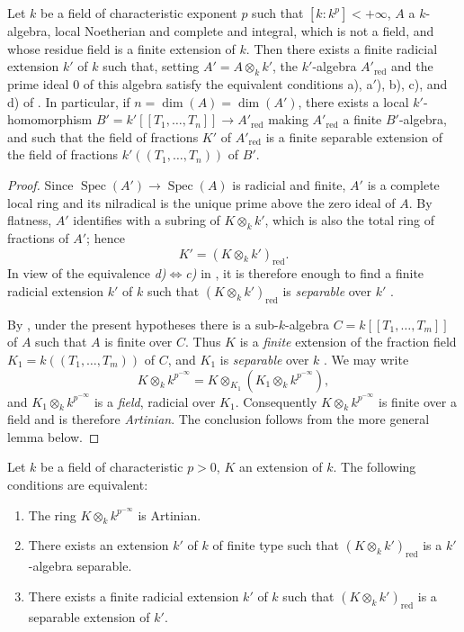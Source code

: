 \begin{corollary}[18.11.12]
\label{IV.18.11.12}
Let $k$ be a field of characteristic exponent $p$ such that $[k:k^p]<+\infty$, $A$ a $k$-algebra, local Noetherian and complete and integral, which is not a field, and whose residue field is a finite extension of $k$.
Then there exists a finite radicial extension $k'$ of $k$ such that, setting $A'=A\otimes_kk'$, the $k'$-algebra $A'_{\mathrm{red}}$ and the prime ideal $0$ of this algebra satisfy the equivalent conditions \textup{a)}, \textup{a$'$)}, \textup{b)}, \textup{c)}, and \textup{d)} of .
In particular, if $n=\dim(A)=\dim(A')$,
there exists a local $k'$-homomorphism $B'=k'[[T_1,\ldots,T_n]]\to A'_\mathrm{red}$ making $A'_\mathrm{red}$ a finite $B'$-algebra, and such that the field of fractions $K'$ of $A'_\mathrm{red}$ is a finite \textup{separable} extension of the field of fractions $k'((T_1,\ldots,T_n))$ of $B'$.
\end{corollary}

\begin{proof}
Since $\operatorname{Spec}(A')\to\operatorname{Spec}(A)$ is radicial and finite, $A'$ is a complete local ring and its nilradical is the unique prime above the zero ideal of $A$. By flatness, $A'$ identifies with a subring of $K\otimes_kk'$, which is also the total ring of fractions of $A'$; hence
\[
  K'=(K\otimes_kk')_{\mathrm{red}}.
\]
In view of the equivalence \emph{d)}$\Leftrightarrow$\emph{c)} in , it is therefore enough to find a finite radicial extension $k'$ of $k$ such that $(K\otimes_kk')_{\mathrm{red}}$ is \emph{separable} over $k'$ .

By , under the present hypotheses there is a sub-$k$-algebra $C=k[[T_1,\ldots,T_m]]$ of $A$ such that $A$ is finite over $C$. Thus $K$ is a \emph{finite} extension of the fraction field $K_1=k((T_1,\ldots,T_m))$ of $C$, and $K_1$ is \emph{separable} over $k$ . We may write
\[
  K\otimes_kk^{p^{-\infty}}
  =K\otimes_{K_1}(K_1\otimes_kk^{p^{-\infty}}),
\]
and $K_1\otimes_kk^{p^{-\infty}}$ is a \emph{field}, radicial over $K_1$. Consequently $K\otimes_kk^{p^{-\infty}}$ is finite over a field and is therefore \emph{Artinian}. The conclusion follows from the more general lemma below.
\end{proof}

\begin{lemma}[18.11.12.1]
\label{IV.18.11.12.1}
Let $k$ be a field of characteristic $p>0$, $K$ an extension of $k$.
The following conditions are equivalent:
\begin{enumerate}[label=\emph{\alph*)}]
  \item The ring $K\otimes_kk^{p^{-\infty}}$ is Artinian.
  \item There exists an extension $k'$ of $k$ of finite type such that $(K\otimes_kk')_{\mathrm{red}}$ is a $k'$-algebra separable.
  \item There exists a finite radicial extension $k'$ of $k$ such that $(K\otimes_kk')_\mathrm{red}$ is a separable extension of $k'$.
\end{enumerate}
\end{lemma}

